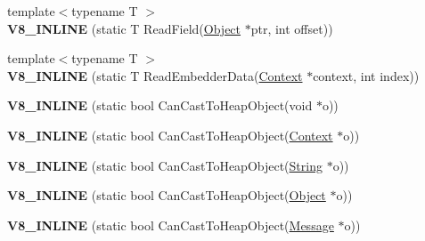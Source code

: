 \begin{DoxyCompactItemize}
\item 
\hypertarget{classv8_1_1internal_1_1_internals_a07da7e32f4f7ee58846b6f54f6785ed3}{}{\footnotesize template$<$typename T $>$ }\\{\bfseries V8\+\_\+\+I\+N\+L\+I\+N\+E} (static T Read\+Field(\hyperlink{classv8_1_1_object}{Object} $\ast$ptr, int offset))\label{classv8_1_1internal_1_1_internals_a07da7e32f4f7ee58846b6f54f6785ed3}

\item 
\hypertarget{classv8_1_1internal_1_1_internals_a065d87c2ee41c1a93c59ca9b3cc361dd}{}{\footnotesize template$<$typename T $>$ }\\{\bfseries V8\+\_\+\+I\+N\+L\+I\+N\+E} (static T Read\+Embedder\+Data(\hyperlink{classv8_1_1_context}{Context} $\ast$context, int index))\label{classv8_1_1internal_1_1_internals_a065d87c2ee41c1a93c59ca9b3cc361dd}

\item 
\hypertarget{classv8_1_1internal_1_1_internals_a37bdb8bc6f18868b28b81238103ec04a}{}{\bfseries V8\+\_\+\+I\+N\+L\+I\+N\+E} (static bool Can\+Cast\+To\+Heap\+Object(void $\ast$o))\label{classv8_1_1internal_1_1_internals_a37bdb8bc6f18868b28b81238103ec04a}

\item 
\hypertarget{classv8_1_1internal_1_1_internals_a14d1baa0483d1c63ddb360e47766581a}{}{\bfseries V8\+\_\+\+I\+N\+L\+I\+N\+E} (static bool Can\+Cast\+To\+Heap\+Object(\hyperlink{classv8_1_1_context}{Context} $\ast$o))\label{classv8_1_1internal_1_1_internals_a14d1baa0483d1c63ddb360e47766581a}

\item 
\hypertarget{classv8_1_1internal_1_1_internals_a42a605e97d72df73beff0010551260b5}{}{\bfseries V8\+\_\+\+I\+N\+L\+I\+N\+E} (static bool Can\+Cast\+To\+Heap\+Object(\hyperlink{classv8_1_1_string}{String} $\ast$o))\label{classv8_1_1internal_1_1_internals_a42a605e97d72df73beff0010551260b5}

\item 
\hypertarget{classv8_1_1internal_1_1_internals_a6cd35b7bff8944dae049cf6a41569a15}{}{\bfseries V8\+\_\+\+I\+N\+L\+I\+N\+E} (static bool Can\+Cast\+To\+Heap\+Object(\hyperlink{classv8_1_1_object}{Object} $\ast$o))\label{classv8_1_1internal_1_1_internals_a6cd35b7bff8944dae049cf6a41569a15}

\item 
\hypertarget{classv8_1_1internal_1_1_internals_a44c66d40648bb6d3168f2402917f5c9e}{}{\bfseries V8\+\_\+\+I\+N\+L\+I\+N\+E} (static bool Can\+Cast\+To\+Heap\+Object(\hyperlink{classv8_1_1_message}{Message} $\ast$o))\label{classv8_1_1internal_1_1_internals_a44c66d40648bb6d3168f2402917f5c9e}


\end{DoxyCompactItemize}
